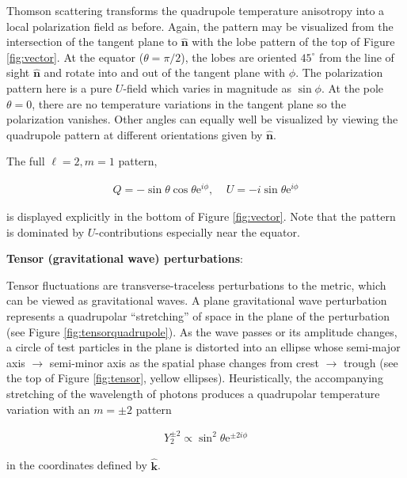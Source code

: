 \documentclass[a4paper,11pt]{article}
\begin{document}
{\noindent}Thomson scattering transforms the quadrupole temperature anisotropy into a local polarization field as before. Again, the pattern may be visualized from the intersection of the tangent plane to $\bm{\hat{n}}$ with the lobe pattern of the top of Figure \ref{fig:vector}. At the equator ($\theta=\pi/2$), the lobes are oriented $45^\circ$ from the line of sight $\bm{\hat{n}}$ and rotate into and out of the tangent plane with $\phi$. The polarization pattern here is a pure $U$-field which varies in magnitude as $\sin\phi$. At the pole $\theta=0$, there are no temperature variations in the tangent plane so the polarization vanishes. Other angles can equally well be visualized by viewing the quadrupole pattern at different orientations given by $\bm{\hat{n}}$.

{\noindent}The full $\ell=2,m=1$ pattern,

\begin{align*}
    Q=-\sin\theta\cos\theta\mathrm{e}^{i\phi},~~~~~U=-i\sin\theta\mathrm{e}^{i\phi}
\end{align*}

{\noindent}is displayed explicitly in the bottom of Figure \ref{fig:vector}. Note that the pattern is dominated by $U$-contributions especially near the equator.

{\noindent}\textbf{Tensor (gravitational wave) perturbations}:

{\noindent}Tensor fluctuations are transverse-traceless perturbations to the metric, which can be viewed as gravitational waves. A plane gravitational wave perturbation represents a quadrupolar ``stretching'' of space in the plane of the perturbation (see Figure \ref{fig:tensorquadrupole}). As the wave passes or its amplitude changes, a circle of test particles in the plane is distorted into an ellipse whose semi-major axis $\rightarrow$ semi-minor axis as the spatial phase changes from crest $\rightarrow$ trough (see the top of Figure \ref{fig:tensor}, yellow ellipses). Heuristically, the accompanying stretching of the wavelength of photons produces a quadrupolar temperature variation with an $m=\pm2$ pattern

\begin{align*}
    Y_2^{\pm2}\propto\sin^2\theta\mathrm{e}^{\pm2i\phi}
\end{align*}

{\noindent}in the coordinates defined by $\bm{\hat{k}}$.
\end{document}
